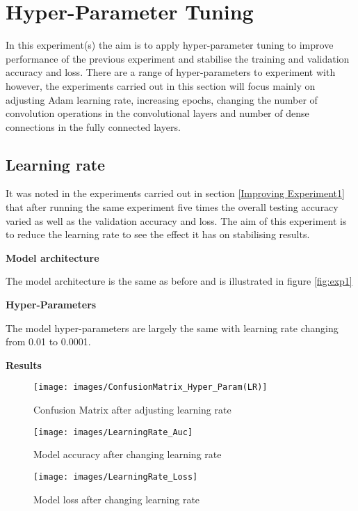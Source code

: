 \section{Hyper-Parameter Tuning}

In this experiment(s) the aim is to apply hyper-parameter tuning to improve performance of the previous experiment and stabilise the training and validation accuracy and loss. There are a range of hyper-parameters to experiment with however, the experiments carried out in this section will focus mainly on adjusting Adam learning rate, increasing epochs, changing the number of convolution operations in the convolutional layers and number of dense connections in the fully connected layers.

\subsection{Learning rate}

It was noted in the experiments carried out in section \ref{Improving Experiment1} that after running the same experiment five times the overall testing accuracy varied as well as the validation accuracy and loss. The aim of this experiment is to reduce the learning rate to see the effect it has on stabilising results. 

\textbf{Model architecture}

The model architecture is the same as before and is illustrated in figure \ref{fig:exp1}

\textbf{Hyper-Parameters}

The model hyper-parameters are largely the same with learning rate changing from 0.01 to 0.0001. 

\textbf{Results}

\begin{figure}[H]
	\centering
	\hspace{-1cm}
	\texttt{[image: images/ConfusionMatrix\_Hyper\_Param(LR)]}

	\caption{Confusion Matrix after adjusting learning rate}
	\label{fig:exp1.2LR}
\end{figure}


\begin{figure}[H]
	\centering
	\texttt{[image: images/LearningRate\_Auc]}
	\caption{Model accuracy after changing learning rate}
	\label{fig:exp1.2LRAuc}
\end{figure}

\begin{figure}[H]
	\centering
	\texttt{[image: images/LearningRate\_Loss]}
	\caption{Model loss after changing learning rate}
	\label{fig:exp1.2LRLoss}
\end{figure}

